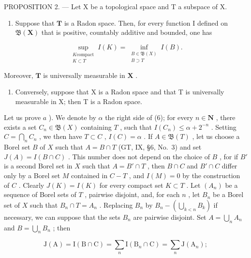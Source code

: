 PROPOSITION 2. --- Let X be a topological space and T a subspace of X.

\begin{enumerate}
\def\labelenumi{\alph{enumi})}
\tightlist
\item
  Suppose that \(\mathbf{T}\) is a Radon space. Then, for every function I defined on \(\mathfrak{B}(\mathbf{X})\) that is positive, countably additive and bounded, one has
\end{enumerate}

\[
\sup_{\substack{K\text{compact}\\ K\subset T}}I(K) = \inf_{\substack{B\in \mathfrak{B}(X)\\ B\supset T}}I(B).\tag{6}
\]

Moreover, \(\mathbf{T}\) is universally measurable in \(\mathbf{X}\) .

\begin{enumerate}
\def\labelenumi{\alph{enumi})}
\setcounter{enumi}{1}
\tightlist
\item
  Conversely, suppose that X is a Radon space and that T is universally measurable in X; then T is a Radon space.
\end{enumerate}

Let us prove \(a\) ). We denote by \(\alpha\) the right side of (6); for every \(n \in \mathbf{N}\) , there exists a set \(C_n \in \mathfrak{B}(X)\) containing \(T\) , such that \(I(C_n) \leqslant \alpha + 2^{-n}\) . Setting \(C = \bigcap_{n} C_n\) , we then have \(T \subset C\) , \(I(C) = \alpha\) . If \(A \in \mathfrak{B}(T)\) , let us choose a Borel set \(B\) of \(X\) such that \(A = B \cap T\) (GT, IX, §6, No.~3) and set \(J(A) = I(B \cap C)\) . This number does not depend on the choice of \(B\) , for if \(B'\) is a second Borel set in \(X\) such that \(A = B' \cap T\) , then \(B \cap C\) and \(B' \cap C\) differ only by a Borel set \(M\) contained in \(C - T\) , and \(I(M) = 0\) by the construction of \(C\) . Clearly \(J(K) = I(K)\) for every compact set \(K \subset T\) . Let \((A_n)\) be a sequence of Borel sets of \(T\) , pairwise disjoint, and, for each \(n\) , let \(B_n\) be a Borel set of \(X\) such that \(B_n \cap T = A_n\) . Replacing \(B_n\) by \(B_n - \left( \bigcup_{k < n} B_k \right)\) if necessary, we can suppose that the sets \(B_n\) are pairwise disjoint. Set \(A = \bigcup_{n} A_n\) and \(B = \bigcup_{n} B_n\) ; then

\[
\mathrm{J} (\mathrm{A}) = \mathrm{I} (\mathrm{B} \cap \mathrm{C}) = \sum_ {n} \mathrm{I} (\mathrm{B} _ {n} \cap \mathrm{C}) = \sum_ {n} \mathrm{J} (\mathrm{A} _ {n});
\]

